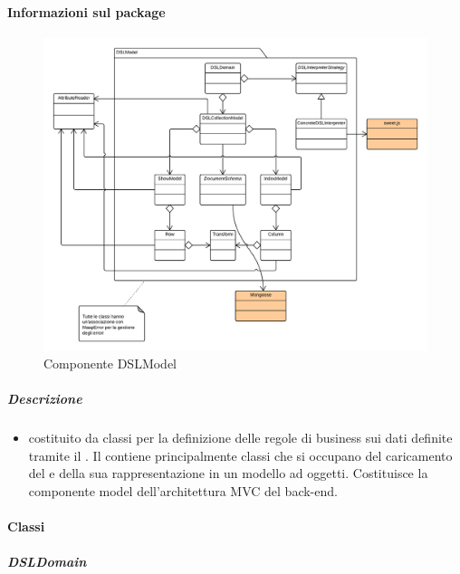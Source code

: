 	\paragraph{Informazioni sul package} 
		\begin{figure}[H] 
			\begin{center} 
				\includegraphics[width=\textwidth]{uml/package/Back-end::Lib::Model::DSLModel.png}  
				\caption{Componente DSLModel}
			\end{center}  
		\end{figure} 
	\subparagraph{Descrizione} 
		\begin{itemize}
		\item[]  costituito da classi per la definizione delle regole di business sui dati definite tramite il  . Il  contiene principalmente classi che si occupano del caricamento del  e della sua rappresentazione in un modello ad oggetti. Costituisce la componente model dell’architettura MVC del back-end.

		\end{itemize} 
		\paragraph{Classi}
			\subparagraph{DSLDomain}
				
